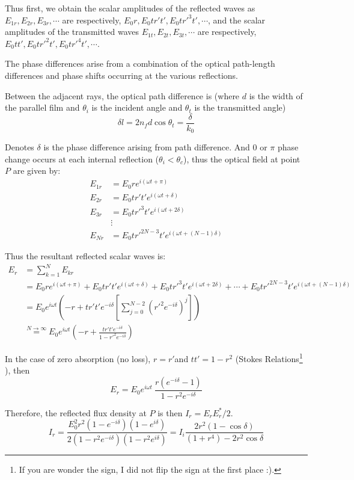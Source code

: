 \documentclass[UTF8]{book}
\begin{document}
Thus first, we obtain the scalar amplitudes of the reflected waves as $E_{1r},E_{2r},E_{3r},\cdots $ are respectively, $E_0r,E_0tr't',E_0tr'^3t',\cdots $, and the scalar amplitudes of the transmitted waves $E_{1t},E_{2t},E_{3t},\cdots $ are respectively, $E_0tt',E_0tr'^2t',E_0tr'^4t',\cdots$.

The phase differences arise from a combination of the optical path-length differences and phase shifts occurring at the various reflections. 

Between the adjacent rays, the optical path difference is (where $d$ is the width of the parallel film and $\theta _i$ is the incident angle and $\theta _t$ is the transmitted angle)
\[\delta l=2n_fd\cos \theta _t=\frac{\delta }{k_0}\]

Denotes $\delta $ is the phase difference arising from path difference. And $0$ or $\pi $ phase change occurs at each internal reflection ($\theta _i<\theta _c$), thus the optical field at point $P$ are given by:
\begin{align*}
E_{1r}&=E_0re^{i(\omega t+\pi)}\\
E_{2r}&=E_0tr't'e^{i(\omega t+\delta)}\\
E_{3r}&=E_0tr'^3t'e^{i(\omega t+2\delta)}\\
&\vdots\\
E_{Nr}&=E_0tr'^{2N-3}t'e^{i(\omega t+(N-1)\delta)}
\end{align*}

Thus the resultant reflected scalar waves is:
\begin{align*}
E_r&=\sum _{k=1}^{N}E_{kr}\\
&=E_0re^{i(\omega t+\pi)}+E_0tr't'e^{i(\omega t+\delta)}+E_0tr'^3t'e^{i(\omega t+2\delta)}+\cdots +E_0tr'^{2N-3}t'e^{i(\omega t+(N-1)\delta)}\\
&=E_0e^{i\omega t}\left(-r+tr't'e^{-i\delta }\left[\sum _{j=0}^{N-2}\left(r'^2e^{-i\delta}\right)^j\right]\right)\\
&\overset{N\to \infty}{=} E_0e^{i\omega t}\left(-r+\frac{tr't'e^{-i\delta }}{1-r'^2e^{-i\delta }}\right)
\end{align*}

In the case of zero absorption (no loss), $r=r'$and $tt'=1-r^2$ (Stokes Relations\footnote{If you are wonder the sign, I did not flip the sign at the first place :).} ), then
\[E_r=E_0e^{i\omega t}\ \frac{r(e^{-i\delta}-1)}{1-r^2e^{-i\delta}}\]

Therefore, the reflected flux density at $P$ is then $I_r=E_rE_r^*/2$. 
\[I_r=\frac{E_0^2r^2(1-e^{-i\delta })(1-e^{i\delta })}{2(1-r^2e^{-i\delta })(1-r^2e^{i\delta })}=I_i\frac{2r^2(1-\cos \delta)}{(1+r^4)-2r^2\cos \delta}\]
\end{document}

